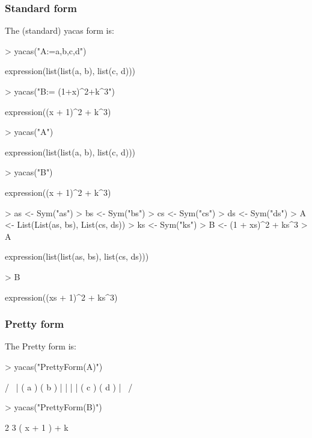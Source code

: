 \documentclass[]{article}
\begin{document}
\subsubsection{Standard form}
The (standard)
yacas form is:
\begin{Schunk}
\begin{Sinput}
> yacas("A:={{a,b},{c,d}}")
\end{Sinput}
\begin{Soutput}
expression(list(list(a, b), list(c, d)))
\end{Soutput}
\begin{Sinput}
> yacas("B:= (1+x)^2+k^3")
\end{Sinput}
\begin{Soutput}
expression((x + 1)^2 + k^3)
\end{Soutput}
\begin{Sinput}
> yacas("A")
\end{Sinput}
\begin{Soutput}
expression(list(list(a, b), list(c, d)))
\end{Soutput}
\begin{Sinput}
> yacas("B")
\end{Sinput}
\begin{Soutput}
expression((x + 1)^2 + k^3)
\end{Soutput}
\end{Schunk}

\begin{Schunk}
\begin{Sinput}
> as <- Sym("as")
> bs <- Sym("bs")
> cs <- Sym("cs")
> ds <- Sym("ds")
> A <- List(List(as, bs), List(cs, ds))
> ks <- Sym("ks")
> B <- (1 + xs)^2 + ks^3
> A
\end{Sinput}
\begin{Soutput}
expression(list(list(as, bs), list(cs, ds)))
\end{Soutput}
\begin{Sinput}
> B
\end{Sinput}
\begin{Soutput}
expression((xs + 1)^2 + ks^3)
\end{Soutput}
\end{Schunk}


\subsubsection{Pretty form}
The Pretty form is:
\begin{Schunk}
\begin{Sinput}
> yacas("PrettyForm(A)")
\end{Sinput}
\begin{Soutput}
/              \
| ( a ) ( b )  |
|              |
| ( c ) ( d )  |
\              /
\end{Soutput}
\begin{Sinput}
> yacas("PrettyForm(B)")
\end{Sinput}
\begin{Soutput}
         2    3
( x + 1 )  + k 
\end{Soutput}
\end{Schunk}
\end{document}

